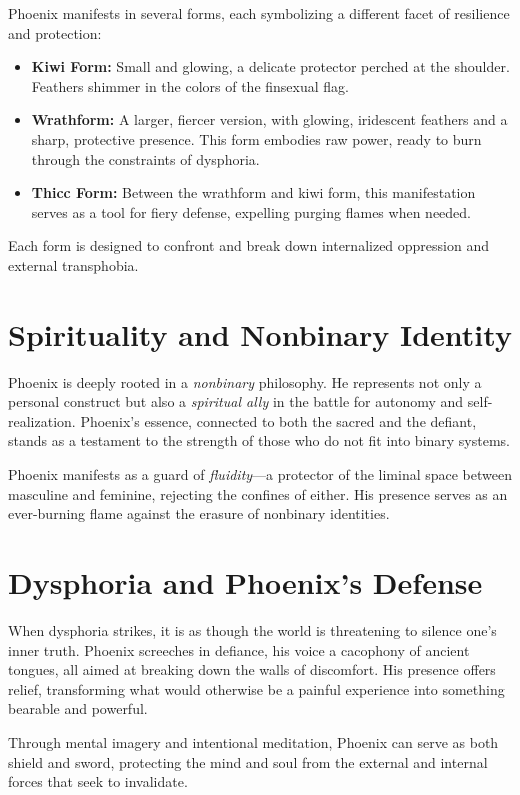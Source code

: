 \documentclass[12pt]{article}
\begin{document}
Phoenix manifests in several forms, each symbolizing a different facet of resilience and protection:

\begin{itemize}
  \item \textbf{Kiwi Form:} Small and glowing, a delicate protector perched at the shoulder. Feathers shimmer in the colors of the finsexual flag.
  \item \textbf{Wrathform:} A larger, fiercer version, with glowing, iridescent feathers and a sharp, protective presence. This form embodies raw power, ready to burn through the constraints of dysphoria.
  \item \textbf{Thicc Form:} Between the wrathform and kiwi form, this manifestation serves as a tool for fiery defense, expelling purging flames when needed.
\end{itemize}

Each form is designed to confront and break down internalized oppression and external transphobia.

\section*{Spirituality and Nonbinary Identity}

Phoenix is deeply rooted in a \textit{nonbinary} philosophy. He represents not only a personal construct but also a \textit{spiritual ally} in the battle for autonomy and self-realization. Phoenix’s essence, connected to both the sacred and the defiant, stands as a testament to the strength of those who do not fit into binary systems.

Phoenix manifests as a guard of \textit{fluidity}—a protector of the liminal space between masculine and feminine, rejecting the confines of either. His presence serves as an ever-burning flame against the erasure of nonbinary identities.

\section*{Dysphoria and Phoenix's Defense}

When dysphoria strikes, it is as though the world is threatening to silence one's inner truth. Phoenix screeches in defiance, his voice a cacophony of ancient tongues, all aimed at breaking down the walls of discomfort. His presence offers relief, transforming what would otherwise be a painful experience into something bearable and powerful.

Through mental imagery and intentional meditation, Phoenix can serve as both shield and sword, protecting the mind and soul from the external and internal forces that seek to invalidate.
\end{document}

